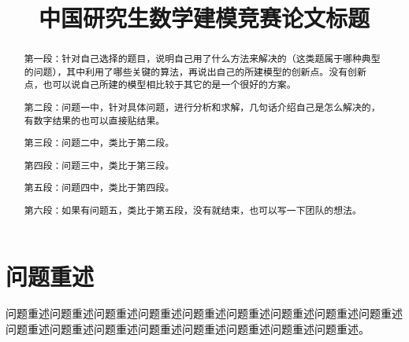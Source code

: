 \documentclass[bwprint]{gmcmthesis}
\title{中国研究生数学建模竞赛论文标题}
\numberwithin{figure}{section}
\begin{document}
 \maketitle
 \begin{abstract}
第一段：针对自己选择的题目，说明自己用了什么方法来解决的（这类题属于哪种典型的问题），其中利用了哪些关键的算法，再说出自己的所建模型的创新点。没有创新点，也可以说自己所建的模型相比较于其它的是一个很好的方案。

第二段：问题一中，针对具体问题，进行分析和求解，几句话介绍自己是怎么解决的，有数字结果的也可以直接贴结果。

第三段：问题二中，类比于第二段。

第四段：问题三中，类比于第三段。

第五段：问题四中，类比于第四段。

第六段：如果有问题五，类比于第五段，没有就结束，也可以写一下团队的想法。






\end{abstract}


\tableofcontents

\section{问题重述}
问题重述问题重述问题重述问题重述问题重述问题重述问题重述问题重述问题重述问题重述问题重述问题重述问题重述问题重述问题重述问题重述问题重述。
\end{document}
